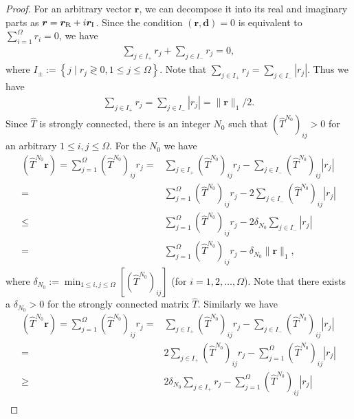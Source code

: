 \begin{proof}
	For an arbitrary vector $\bm{r}$, we can decompose it into its real and imaginary parts as $\bm{r}=\bm{r}_{\rm R} + i\bm{r}_{\rm I}$. Since the condition $(\bm{r},\bm{d}) = 0$ is equivalent to $\sum_{i=1}^{\Omega}r_{i} = 0$, we have
	\begin{align}
	\sum_{j\in I_{+}}r_{j} + \sum_{j\in I_{-}}r_{j} = 0,
	\end{align}
	where $I_{\pm}:=\left\{j\mid r_{j}\gtrless 0,1\leq j\leq \Omega\right\}$. Note that $\sum_{j\in I_{+}}r_{j} = \sum_{j\in I_{-}}|r_{j}|$.  Thus we have
	\begin{align}
	\sum_{j\in I_{+}}r_{j} = \sum_{j\in I_{-}}|r_{j}| = \|\bm{r}\|_{1} / 2.
	\end{align}
	Since $\hat{T}$ is strongly connected, there is an integer $N_{0}$ such that $\left(\hat{T}^{N_{0}}\right)_{ij}>0$ for an arbitrary $1\leq i,j\leq \Omega$. For the $N_{0}$ we have
	\begin{align}
	\left(\hat{T}^{N_{0}}\bm{r}\right) = \sum_{j=1}^{\Omega}\left(\hat{T}^{N_{0}}\right)_{ij}r_{j} =& \sum_{j\in I_{+}}\left(\hat{T}^{N_{0}}\right)_{ij}r_{j} - \sum_{j\in I_{-}}\left(\hat{T}^{N_{0}}\right)_{ij}|r_{j}|\\
	=& \sum_{j=1}^{\Omega}\left(\hat{T}^{N_{0}}\right)_{ij}r_{j} - 2\sum_{j\in I_{-}}\left(\hat{T}^{N_{0}}\right)_{ij}|r_{j}|\\
	\leq& \sum_{j=1}^{\Omega}\left(\hat{T}^{N_{0}}\right)_{ij}r_{j} - 2\delta_{N_{0}}\sum_{j\in I_{-}}|r_{j}|\\
	=& \sum_{j=1}^{\Omega}\left(\hat{T}^{N_{0}}\right)_{ij}r_{j} - \delta_{N_{0}}\|\bm{r}\|_{1},
	\end{align}
	where $\displaystyle\delta_{N_{0}}:= \min_{1\leq i,j\leq \Omega}\left[\left(\hat{T}^{N_{0}}\right)_{ij}\right]$ (for $i=1,2,\dots,\Omega$). Note that there exists a $\delta_{N_{0}} > 0$ for the strongly connected matrix   $\hat{T}$. Similarly we have
	\begin{align}
	\left(\hat{T}^{N_{0}}\bm{r}\right) = \sum_{j=1}^{\Omega}\left(\hat{T}^{N_{0}}\right)_{ij}r_{j} =& \sum_{j\in I_{+}}\left(\hat{T}^{N_{0}}\right)_{ij}r_{j} - \sum_{j\in I_{-}}\left(\hat{T}^{N_{0}}\right)_{ij}|r_{j}|\\
	=& 2\sum_{j\in I_{+}}\left(\hat{T}^{N_{0}}\right)_{ij}r_{j} - \sum_{j=1}^{\Omega}\left(\hat{T}^{N_{0}}\right)_{ij}|r_{j}|\\
	\geq& 2\delta_{N_{0}}\sum_{j\in I_{+}}r_{j} - \sum_{j=1}^{\Omega}\left(\hat{T}^{N_{0}}\right)_{ij}|r_{j}|\\

\end{align}
\end{proof}
